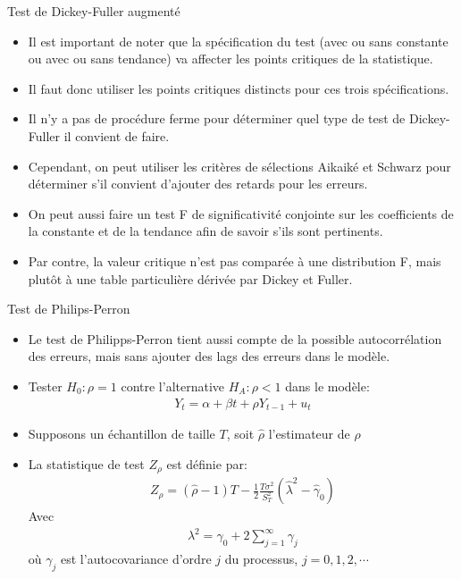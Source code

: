 \documentclass{beamer}
\begin{document}
\begin{frame}{Test de Dickey-Fuller augmenté} 
\begin{itemize}
\item Il est important de noter que la spécification du test (avec ou sans constante ou avec ou sans tendance) va affecter les points critiques de la statistique. 
\item Il faut donc utiliser les points critiques distincts pour ces trois spécifications. 
\item Il n’y a pas de procédure ferme pour déterminer quel type de test de Dickey-Fuller il convient de faire. 
\item Cependant, on peut utiliser les critères de sélections Aikaiké et Schwarz pour déterminer s’il convient d’ajouter des retards pour les erreurs. 
\item On peut aussi faire un test F de significativité conjointe sur les coefficients de la constante et de la tendance afin de savoir s’ils sont pertinents. 
\item Par contre, la valeur critique n’est pas comparée à une distribution F, mais plutôt à une table particulière dérivée par Dickey et Fuller.
\end{itemize}
\end{frame}

\begin{frame}{Test de Philips-Perron}
\begin{itemize}
\item Le test de Philipps-Perron tient aussi compte de la possible autocorrélation des erreurs, mais sans ajouter des lags des erreurs dans le modèle. 
\item Tester $H_0: \rho =1$ contre l’alternative $H_A: \rho < 1$ dans le modèle:
\begin{align*}
Y_t=\alpha +\beta t +\rho Y_{t-1}+u_t
\end{align*}
\item Supposons un échantillon de taille $T$, soit $\hat{\rho}$ l'estimateur de $\rho$
\item La statistique de test $Z_{\rho}$ est définie par:
\begin{align*}
Z_{\rho}=(\hat{\rho}-1)T-\frac{1}{2}\frac{T \sigma^2}{S_T^2}(\hat{\lambda}^2-\hat{\gamma}_0)
\end{align*}
Avec 
\begin{align*}
\lambda^2=\gamma_0+2\sum_{j=1}^{\infty} \gamma_j
\end{align*}
où $\gamma_j$ est l’autocovariance d’ordre $j$ du processus, $j = 0, 1, 2,\cdots$
\end{itemize}
\end{frame}
\end{document}
